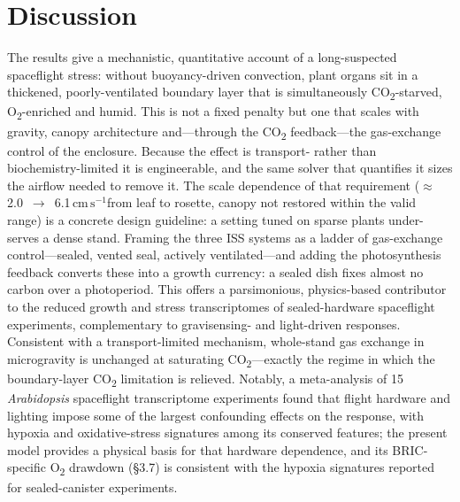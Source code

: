 \documentclass[10pt]{article}
\newcommand{\cmsu}{\ensuremath{\mathrm{cm\,s^{-1}}}}
\newcommand{\co}{CO\textsubscript{2}}
\newcommand{\oo}{O\textsubscript{2}}
\begin{document}
\section{Discussion}
The results give a mechanistic, quantitative account of a long-suspected spaceflight stress: without buoyancy-driven
convection, plant organs sit in a thickened, poorly-ventilated boundary layer that is simultaneously \co-starved,
\oo-enriched and humid. This is not a fixed penalty but one that scales with gravity, canopy architecture and---through
the \co{} feedback---the gas-exchange control of the enclosure. Because the effect is transport- rather than
biochemistry-limited it is engineerable, and the same solver that quantifies it sizes the airflow needed to remove it.
The scale dependence of that requirement ($\approx$2.0~$\to$~6.1\,\cmsu from leaf to rosette, canopy not restored
within the valid range) is a concrete design
guideline: a setting tuned on sparse plants under-serves a dense stand. Framing the three ISS systems as a ladder of
gas-exchange control---sealed, vented seal, actively ventilated---and adding the photosynthesis feedback converts these
into a growth currency: a sealed dish fixes almost no carbon over a photoperiod. This offers a parsimonious, physics-based
contributor to the reduced growth and stress transcriptomes of sealed-hardware spaceflight
experiments\citep{correll2013,parafilm}, complementary to gravisensing- and light-driven responses\citep{cara}.
Consistent with a transport-limited mechanism, whole-stand gas exchange in microgravity is unchanged at
saturating \co\citep{monje2005}---exactly the regime in which the boundary-layer \co{} limitation is relieved.
Notably, a meta-analysis of 15 \textit{Arabidopsis} spaceflight transcriptome experiments found that flight
hardware and lighting impose some of the largest confounding effects on the response, with hypoxia and
oxidative-stress signatures among its conserved features\citep{barker2023}; the present model provides a
physical basis for that hardware dependence, and its BRIC-specific \oo{} drawdown (\S3.7) is consistent with
the hypoxia signatures reported for sealed-canister experiments.
\end{document}
